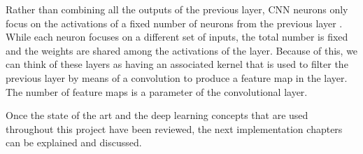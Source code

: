 Rather than combining all the outputs of the previous layer, CNN neurons only focus on the activations of a fixed number of neurons from the previous layer \cite{krizhevsky2012imagenet}. While each neuron focuses on a different set of inputs, the total number is fixed and the weights are shared among the activations of the layer. Because of this, we can think of these layers as having an associated kernel that is used to filter the previous layer by means of a convolution to produce a feature map in the layer. The number of feature maps is a parameter of the convolutional layer. %

Once the state of the art and the deep learning concepts  that are used throughout this project have been reviewed, the next implementation chapters can be explained and discussed.
